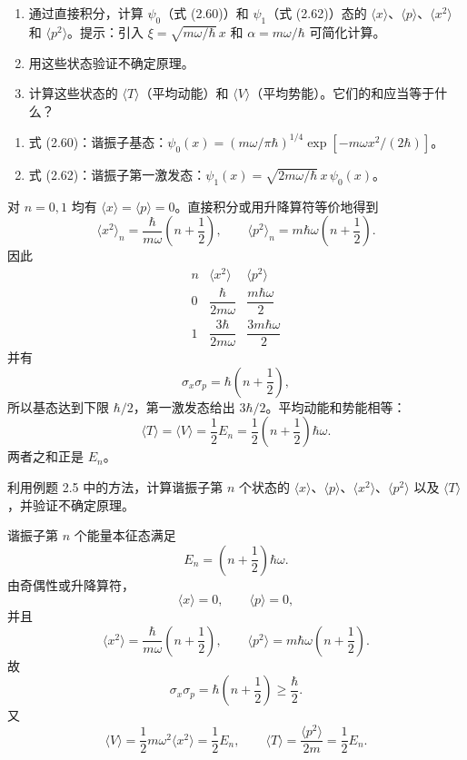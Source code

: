 \begin{question}
\begin{enumerate}
\item 通过直接积分，计算 $\psi_0$（式 (2.60)）和 $\psi_1$（式 (2.62)）态的 $\langle x\rangle$、$\langle p\rangle$、$\langle x^2\rangle$ 和 $\langle p^2\rangle$。提示：引入 $\xi=\sqrt{m\omega/\hbar}\,x$ 和 $\alpha=m\omega/\hbar$ 可简化计算。
\item 用这些状态验证不确定原理。
\item 计算这些状态的 $\langle T\rangle$（平均动能）和 $\langle V\rangle$（平均势能）。它们的和应当等于什么？
\end{enumerate}

\par\smallskip
{}
\begin{enumerate}[leftmargin=2.2em,itemsep=0.12em,topsep=0.12em,parsep=0pt]
\item 式 (2.60)：谐振子基态：$\psi_0(x)=(m\omega/\pi\hbar)^{1/4}\exp[-m\omega x^2/(2\hbar)]$。
\item 式 (2.62)：谐振子第一激发态：$\psi_1(x)=\sqrt{2m\omega/\hbar}\,x\,\psi_0(x)$。
\end{enumerate}

\end{question}
\begin{solution}
对 $n=0,1$ 均有 $\langle x\rangle=\langle p\rangle=0$。直接积分或用升降算符等价地得到
\[
\langle x^2\rangle_n=\frac{\hbar}{m\omega}\left(n+\frac12\right),
\qquad
\langle p^2\rangle_n=m\hbar\omega\left(n+\frac12\right).
\]
因此
\[
\begin{array}{c|cc}
 n&\langle x^2\rangle&\langle p^2\rangle\\ \hline
0&\dfrac{\hbar}{2m\omega}&\dfrac{m\hbar\omega}{2}\\[0.4em]
1&\dfrac{3\hbar}{2m\omega}&\dfrac{3m\hbar\omega}{2}
\end{array}
\]
并有
\[
\sigma_x\sigma_p=\hbar\left(n+\frac12\right),
\]
所以基态达到下限 $\hbar/2$，第一激发态给出 $3\hbar/2$。平均动能和势能相等：
\[
\langle T\rangle=\langle V\rangle=\frac12 E_n
=\frac12\left(n+\frac12\right)\hbar\omega.
\]
两者之和正是 $E_n$。
\end{solution}

\begin{question}
利用例题 2.5 中的方法，计算谐振子第 $n$ 个状态的 $\langle x\rangle$、$\langle p\rangle$、$\langle x^2\rangle$、$\langle p^2\rangle$ 以及 $\langle T\rangle$，并验证不确定原理。
\end{question}
\begin{solution}
谐振子第 $n$ 个能量本征态满足
\[
E_n=\left(n+\frac12\right)\hbar\omega.
\]
由奇偶性或升降算符，
\[
\langle x\rangle=0,
\qquad
\langle p\rangle=0,
\]
并且
\[
\langle x^2\rangle=\frac{\hbar}{m\omega}\left(n+\frac12\right),
\qquad
\langle p^2\rangle=m\hbar\omega\left(n+\frac12\right).
\]
故
\[
\sigma_x\sigma_p=\hbar\left(n+\frac12\right)\ge\frac\hbar2.
\]
又
\[
\langle V\rangle=\frac12m\omega^2\langle x^2\rangle=\frac12E_n,
\qquad
\langle T\rangle=\frac{\langle p^2\rangle}{2m}=\frac12E_n.
\]
\end{solution}

